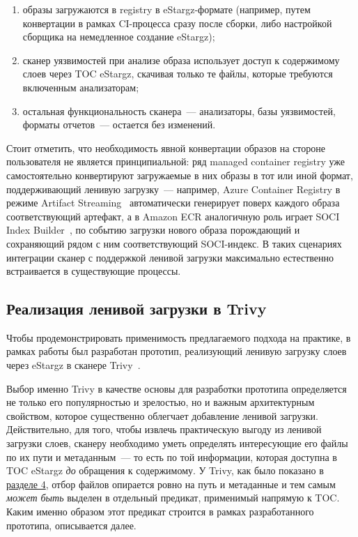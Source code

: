 \begin{enumerate}
\item образы загружаются в registry в eStargz-формате (например, путем конвертации в рамках CI-процесса сразу после сборки, либо настройкой сборщика на немедленное создание eStargz);
\item сканер уязвимостей при анализе образа использует доступ к содержимому слоев через TOC eStargz, скачивая только те файлы, которые требуются включенным анализаторам;
\item остальная функциональность сканера~--- анализаторы, базы уязвимостей, форматы отчетов~--- остается без изменений.
\end{enumerate}

Стоит отметить, что необходимость явной конвертации образов на стороне пользователя не является принципиальной: ряд managed container registry уже самостоятельно конвертируют загружаемые в них образы в тот или иной формат, поддерживающий ленивую загрузку~--- например, Azure Container Registry в режиме Artifact Streaming~\cite{acr_artifact_streaming} автоматически генерирует поверх каждого образа соответствующий артефакт, а в Amazon ECR аналогичную роль играет SOCI Index Builder~\cite{ecr_soci_builder}, по событию загрузки нового образа порождающий и сохраняющий рядом с ним соответствующий SOCI-индекс. В таких сценариях интеграции сканер с поддержкой ленивой загрузки максимально естественно встраивается в существующие процессы.

\subsection{Реализация ленивой загрузки в Trivy}

Чтобы продемонстрировать применимость предлагаемого подхода на практике, в рамках работы был разработан прототип, реализующий ленивую загрузку слоев через eStargz в сканере Trivy~\cite{trivy}.

Выбор именно Trivy в качестве основы для разработки прототипа определяется не только его популярностью и зрелостью, но и важным архитектурным свойством, которое существенно облегчает добавление ленивой загрузки. Действительно, для того, чтобы извлечь практическую выгоду из ленивой загрузки слоев, сканеру необходимо уметь определять интересующие его файлы по их пути и метаданным~--- то есть по той информации, которая доступна в TOC eStargz \textit{до} обращения к содержимому. У Trivy, как было показано в \hyperref[sec:Chapter3]{разделе 4}, отбор файлов опирается ровно на путь и метаданные и тем самым \textit{может быть} выделен в отдельный предикат, применимый напрямую к TOC. Каким именно образом этот предикат строится в рамках разработанного прототипа, описывается далее.

